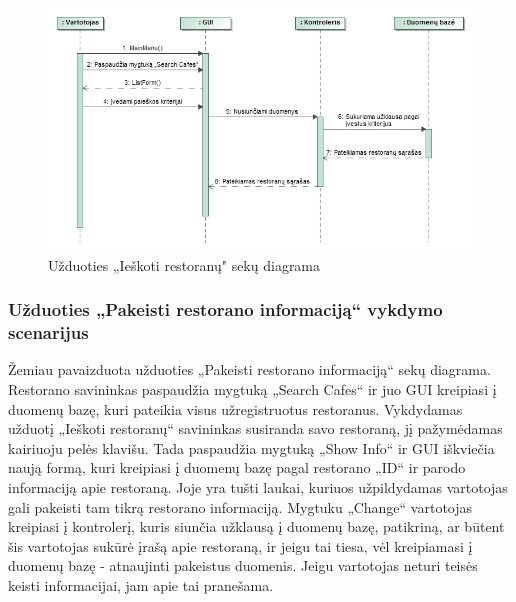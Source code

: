 \documentclass{VUMIFPSkursinis}
\begin{document}
{{{{{%
\begin{figure}[H]
	\centering
	\includegraphics[width=\textwidth,height=\textheight,keepaspectratio]{img/SearchCafes}
	\caption{Užduoties „Ieškoti restoranų" sekų diagrama}
	\label{img:SearchCafes}
\end{figure}

\subsubsection{Užduoties „Pakeisti restorano informaciją“ vykdymo scenarijus}
Žemiau pavaizduota užduoties „Pakeisti restorano informaciją“ sekų diagrama. Restorano savininkas paspaudžia mygtuką „Search Cafes“ ir juo GUI kreipiasi į duomenų bazę, kuri pateikia visus užregistruotus restoranus. Vykdydamas užduotį „Ieškoti restoranų“ savininkas susiranda savo restoraną, jį pažymėdamas kairiuoju pelės klavišu. Tada paspaudžia mygtuką „Show Info“ ir GUI iškviečia naują formą, kuri kreipiasi į duomenų bazę pagal restorano „ID“ ir parodo informaciją apie restoraną. Joje yra tušti laukai, kuriuos užpildydamas vartotojas gali pakeisti tam tikrą restorano informaciją. Mygtuku „Change“ vartotojas kreipiasi į kontrolerį, kuris siunčia užklausą į duomenų bazę, patikriną, ar būtent šis vartotojas sukūrė įrašą apie restoraną, ir jeigu tai tiesa, vėl kreipiamasi į duomenų bazę - atnaujinti pakeistus duomenis. Jeigu vartotojas neturi teisės keisti informacijai, jam apie tai pranešama.

}}}}}
\end{document}
